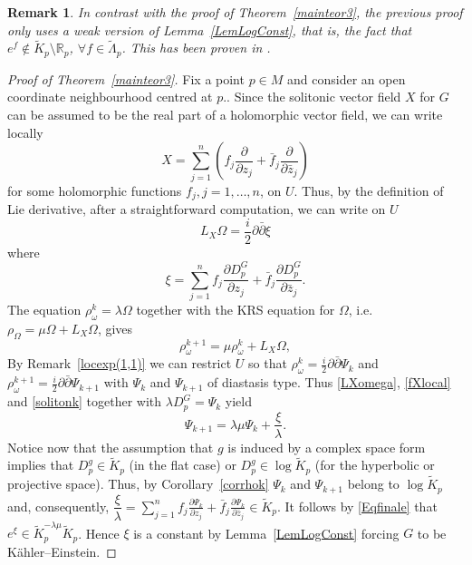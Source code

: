 \documentclass[12pt]{amsart}
\newcommand{\R}{\mathbb{R}}
\newcommand{\K}{K\"{a}hler}
\newtheorem{remark}{Remark}
\begin{document}
 \begin{remark}\rm
 In contrast with the proof of Theorem~\ref{mainteor3}, the previous proof only uses a weak version of Lemma~\ref{LemLogConst}, that is, the fact that 
$e^f\not\in\tilde K_p\setminus \R_p $, 
$\forall f \in\tilde\Lambda_p$. 
This has been proven in \cite[(i) of Theorem~2.1)]{ChengDiscalaYuan17UmeharaAlgebra}.
\end{remark}


\begin{proof}[Proof of Theorem~\ref{mainteor3}]
Fix a point $p\in M$ and consider an open coordinate neighbourhood centred at $p$..
Since the solitonic vector field $X$ for $G$ can be assumed to be the real part of a holomorphic vector field, we can write locally
$$
X=\sum_{j=1}^{n}\left(f_{j} \frac{\partial}{\partial z_j}+\bar{f}_{j}\frac{\partial}{\partial\bar z_j}\right)
$$
for some holomorphic functions $f_{j}, j=1, \ldots, n$, on $U$.
Thus, by the definition of Lie derivative, after a 
straightforward computation, we can write on $U$
\begin{equation}\label{LXomega}
L_X\Omega=\frac{i}{2}\partial\bar\partial\xi
\end{equation}
where 
\begin{equation}\label{fXlocal}
\xi=\sum_{j=1}^nf_j\frac{\partial D^G_p}{\partial z_j}+\bar f_j\frac{\partial D^G_p}{\partial \bar z_j}.
\end{equation}
The equation
$\rho^k_\omega=\lambda\Omega$
together with the KRS  equation for $\Omega$, i.e. $\rho_\Omega =\mu\Omega+L_X\Omega$,  gives
\begin{equation}\label{solitonk}
\rho^{k+1}_{\omega}=\mu\rho^k_\omega +L_X\Omega,
\end{equation}
By Remark~\ref{locexp(1,1)} we can restrict $U$ so that $\rho^k_\omega=\frac{i}{2}\partial\bar\partial\Psi_k$ and 
$\rho^{k+1}_\omega=\frac{i}{2}\partial\bar\partial\Psi_{k+1}$ with $\Psi_k$ and $\Psi_{k+1}$
of diastasis type.
Thus \eqref{LXomega}, \eqref{fXlocal}  and \eqref{solitonk} together with $\lambda D_p^G=\Psi_k$ yield
\begin{equation}\label{Eqfinale}
\Psi_{k+1}=\lambda\mu\Psi_k+\dfrac{\xi}{\lambda}.
\end{equation}
Notice now that the assumption that $g$ is induced by a complex space form implies that $D_p^g\in \tilde K_p$ (in the flat case)
or $D_p^g\in \log\tilde K_p$ (for the hyperbolic or projective space). Thus, by Corollary~\ref{corrhok} $\Psi_k$ and $\Psi_{k+1}$
belong to $\log\tilde K_p$ and, consequently,  $\dfrac{\xi}{\lambda}=\sum_{j=1}^nf_j\frac{\partial \Psi_k}{\partial z_j}+\bar f_j\frac{\partial\Psi_k}{\partial \bar z_j}\in\tilde K_p$.
It follows by \eqref{Eqfinale} that
$e^{\xi}\in \tilde K_p^{-\lambda\mu}\tilde K_p$. 
Hence $\xi$ is a constant by Lemma~\ref{LemLogConst} forcing $G$ to be \K--Einstein.
\end{proof}
\end{document}
